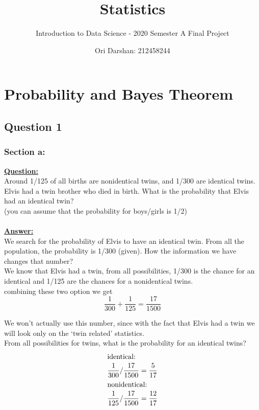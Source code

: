 \documentclass[a4, 12pt,titlepage]{scrartcl}
\title{Statistics}
\subtitle{Introduction to Data Science - 2020 Semester A Final Project}
\author{Ori Darshan: 212458244}
\date{}
\begin{document}
\maketitle

\bigskip
\section{Probability and Bayes Theorem}
\subsection{Question 1}
\subsubsection{Section a:}
\textbf{\underline{Question:}}\\
Around 1/125 of all births are nonidentical twins, and 1/300 are identical twins. Elvis had a twin brother who died in birth. What is the probability that Elvis had an identical twin?\\
(you can assume that the probability for boys/girls is 1/2)\\\smallskip\\
\textbf{\underline{Answer:}}\\
We search for the probability of Elvis to have an identical twin.
From all the population, the probability is 1/300 (given). How the information we have changes that number?\\
We know that Elvis had a twin, from all possibilities, 1/300 is the chance for an identical and 1/125 are the chances for a nonidentical twins.\\
combining these two option we get\[
\frac{1}{300}+\frac{1}{125}=\frac{17}{1500}
\]

We won't actually use this number, since with the fact that Elvis had a twin we will look only on the `twin related' statistics.\\
From all possibilities for twins, what is the probability for an identical twins?\begin{align*}
\intertext{identical:}
\frac{1}{300}/\frac{17}{1500}&=\frac{5}{17}\\
\intertext{nonidentical:}
\frac{1}{125}/\frac{17}{1500}&=\frac{12}{17}\\
\end{align*}
\end{document}
